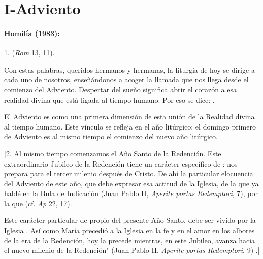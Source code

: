 \chapter{I-Adviento}

\subsubsection{Homilía (1983): }


\begin{body}
	1.  (\emph{Rom} 13, 11).
	
	Con estas palabras, queridos hermanos y hermanas, la liturgia de hoy se dirige a cada uno de nosotros, enseñándonos a acoger la llamada que nos llega desde el comienzo del Adviento. Despertar del sueño significa abrir el corazón a esa realidad divina que está ligada al tiempo humano. Por eso se dice: .
	
	El Adviento es como una primera dimensión de esta unión de la Realidad divina al tiempo humano. Este vínculo se refleja en el año litúrgico: el domingo primero de Adviento es al mismo tiempo el comienzo del nuevo año litúrgico.
	
	{[}2. Al mismo tiempo comenzamos el Año Santo de la Redención. Este extraordinario Jubileo de la Redención tiene un carácter específico de : nos prepara para el tercer milenio después de Cristo. De ahí la particular elocuencia del Adviento de este año, que debe expresar esa actitud de la Iglesia, de la que ya hablé en la Bula de Indicación (Juan Pablo II, {\emph{\emph{Aperite portas Redemptori}}}, 7), por la que  (cf. \emph{Ap} 22, 17).
	
	Este carácter particular de  propio del presente Año Santo, debe ser vivido por la Iglesia . Así como María precedió a la Iglesia en la fe y en el amor en los albores de la era de la Redención, hoy la precede mientras, en este Jubileo, avanza hacia el nuevo milenio de la Redención" (Juan Pablo II, \emph{Aperite portas Redemptori}, 9) .{]}
	

\end{body}
